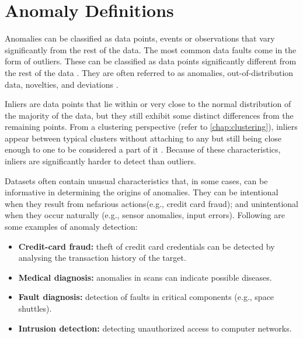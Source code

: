 

\section{Anomaly Definitions}
Anomalies can be classified as data points, events or observations that vary significantly from the rest of the data. The most common data faults come in the form of outliers. These can be classified as data points significantly different from the rest of the data \cite{aggarwal_OutlierAnalysis_2013}. They are often referred to as anomalies, out-of-distribution data, novelties, and deviations \cite{aggarwal_OutlierAnalysis_2013, xia.etal_GANbasedAnomalyDetection_2022}.

Inliers are data points that lie within or very close to the normal distribution of the majority of the data, but they still exhibit some distinct differences from the remaining points. From a clustering perspective (refer to \ref{chap:clustering}), inliers appear between typical clusters without attaching to any but still being close enough to one to be considered a part of it \cite{Talagala.Hyndman.ea_AnomalyDetectionHigh_2019}. Because of these characteristics, inliers are significantly harder to detect than outliers. 

Datasets often contain unusual characteristics that, in some cases, can be informative in determining the origins of anomalies. They can be intentional when they result from nefarious actions(e.g., credit card fraud); and unintentional when they occur naturally (e.g., sensor anomalies, input errors). Following are some examples of anomaly detection: 

\begin{itemize}
    \item \textbf{Credit-card fraud:} theft of credit card credentials can be detected by analysing the transaction history of the target.
    \item \textbf{Medical diagnosis:} anomalies in scans can indicate possible diseases.
    \item \textbf{Fault diagnosis:} detection of faults in critical components (e.g., space shuttles).
    \item  \textbf{Intrusion detection:} detecting unauthorized access to computer networks.
\end{itemize}

